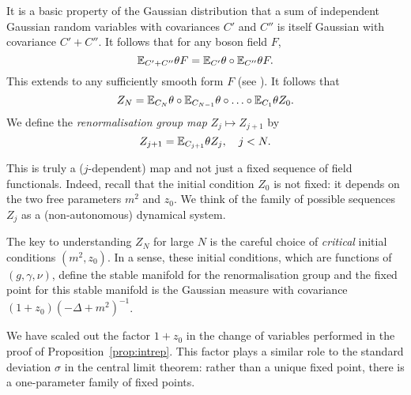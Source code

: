 
It is a basic property  of the Gaussian distribution that a sum of independent Gaussian random
variables with covariances
$C'$ and $C''$ is itself Gaussian with covariance $C' + C''$. It follows that for any
boson field $F$,
\begin{equation}
\mathbb{E}_{C'+C''}\theta F = \mathbb{E}_{C'}\theta \circ \mathbb{E}_{C''}\theta F.
\end{equation}
This extends to any sufficiently smooth form $F$ (see \cite{BS-rg-norm}).
It follows that
\begin{equation}
\label{e:prog-int}
Z_N =
\mathbb{E}_{C_N}\theta \circ \mathbb{E}_{C_{N-1}}\theta \circ \ldots \circ \mathbb{E}_{C_1}\theta Z_0.
\end{equation}
We define the \emph{renormalisation group map} $Z_j \mapsto Z_{j+1}$ by
\begin{equation}
\label{e:rgmapZ}
Z_{j+1} = \mathbb{E}_{C_{j+1}} \theta Z_j, \quad j < N.
\end{equation}

\begin{rk}
This is truly a ($j$-dependent) map and not just a fixed sequence of field
functionals.  Indeed, recall that the initial condition $Z_0$ is not fixed:
it depends on the two free parameters $m^2$ and $z_0$. We think of the family
of possible sequences $Z_j$ as a (non-autonomous) dynamical system.

The key to understanding
$Z_N$ for large $N$ is the careful choice of \emph{critical} initial conditions
$(m^2, z_0)$. In a sense, these initial conditions, which are functions of
$(g, \gamma, \nu)$, define the stable manifold for the renormalisation group
and the fixed point for this stable manifold is the Gaussian measure with covariance
$(1 + z_0) (-\Delta + m^2)^{-1}$.

We have scaled out the factor $1 + z_0$
in the change of variables performed in the proof of Proposition~\ref{prop:intrep}.
This factor plays a similar role to the standard deviation $\sigma$ in the central
limit theorem: rather than a unique fixed point, there is a one-parameter family
of fixed points.
\end{rk}

